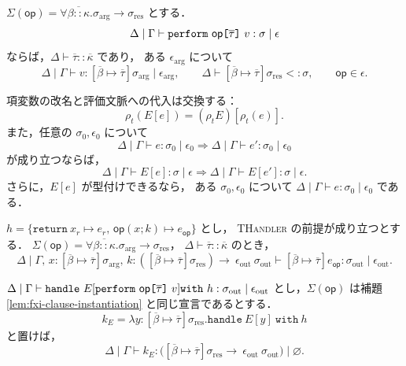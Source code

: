 \begin{lemma}[操作呼出しの型付けの反転]
\label{lem:fxi-perform-inversion}
$\Sigma(\mathsf{op})=
\forall\overline{\beta::\kappa}.
\sigma_{\mathrm{arg}}\to\sigma_{\mathrm{res}}$ とする．
\[
  \Delta\mid\Gamma\vdash
    \texttt{perform}~\mathsf{op}
      \texttt{[} \overline{\tau} \texttt{]}~v:
      \sigma\mid\epsilon
\]
ならば，$\Delta\vdash\overline{\tau}::\overline{\kappa}$ であり，
ある $\epsilon_{\mathrm{arg}}$ について
\[
  \Delta\mid\Gamma\vdash
    v:[\overline{\beta}\mapsto\overline{\tau}]
      \sigma_{\mathrm{arg}}
      \mid\epsilon_{\mathrm{arg}},
  \qquad
  \Delta\vdash
    [\overline{\beta}\mapsto\overline{\tau}]
      \sigma_{\mathrm{res}}<:\sigma,
  \qquad
  \mathsf{op}\in\epsilon.
\]
\end{lemma}

\begin{lemma}
\label{lem:fxi-context}
項変数の改名と評価文脈への代入は交換する：
\[
  \rho_t(E[e])=(\rho_t E)[\rho_t(e)].
\]
また，任意の $\sigma_0,\epsilon_0$ について
\[
  \Delta\mid\Gamma\vdash e:\sigma_0\mid\epsilon_0
  \Longrightarrow
  \Delta\mid\Gamma\vdash e':\sigma_0\mid\epsilon_0
\]
が成り立つならば，
\[
  \Delta\mid\Gamma\vdash E[e]:\sigma\mid\epsilon
  \Longrightarrow
  \Delta\mid\Gamma\vdash E[e']:\sigma\mid\epsilon.
\]
さらに，$E[e]$ が型付けできるなら，
ある $\sigma_0,\epsilon_0$ について
$\Delta\mid\Gamma\vdash e:\sigma_0\mid\epsilon_0$ である．
\end{lemma}

\begin{lemma}[多相操作節の具体化]
\label{lem:fxi-clause-instantiation}
$h=\{\texttt{return}~x_r\mapsto e_r,\,
  \mathsf{op}(x;k)\mapsto e_{\mathsf{op}}\}$ とし，
\textsc{THandler} の前提が成り立つとする．
$\Sigma(\mathsf{op})=
\forall\overline{\beta::\kappa}.
\sigma_{\mathrm{arg}}\to\sigma_{\mathrm{res}}$，
$\Delta\vdash\overline{\tau}::\overline{\kappa}$ のとき，
\[
  \Delta\mid
  \Gamma,\,
  x:[\overline{\beta}\mapsto\overline{\tau}]
      \sigma_{\mathrm{arg}},\,
  k:([\overline{\beta}\mapsto\overline{\tau}]
      \sigma_{\mathrm{res}})
      \rightarrow~\epsilon_{\mathrm{out}}~
      \sigma_{\mathrm{out}}
  \vdash
  [\overline{\beta}\mapsto\overline{\tau}]
    e_{\mathsf{op}}:
    \sigma_{\mathrm{out}}\mid\epsilon_{\mathrm{out}}.
\]
\end{lemma}

\begin{lemma}
\label{lem:fxi-resumption}
$\Delta\mid\Gamma\vdash
\texttt{handle}~
 E[\texttt{perform}~\mathsf{op}\texttt{[} \overline{\tau} \texttt{]}~v]
 \texttt{with}~h:
 \sigma_{\mathrm{out}}\mid\epsilon_{\mathrm{out}}$
とし，$\Sigma(\mathsf{op})$ は補題
\ref{lem:fxi-clause-instantiation} と同じ宣言であるとする．
\[
  k_E =
    \lambda y:
      [\overline{\beta}\mapsto\overline{\tau}]
        \sigma_{\mathrm{res}}.
    \texttt{handle}~E[y]~\texttt{with}~h
\]
と置けば，
\[
  \Delta\mid\Gamma\vdash k_E:
  \bigl(
    [\overline{\beta}\mapsto\overline{\tau}]
      \sigma_{\mathrm{res}}
    \rightarrow~\epsilon_{\mathrm{out}}~
      \sigma_{\mathrm{out}}
  \bigr)\mid\varnothing.
\]
\end{lemma}

